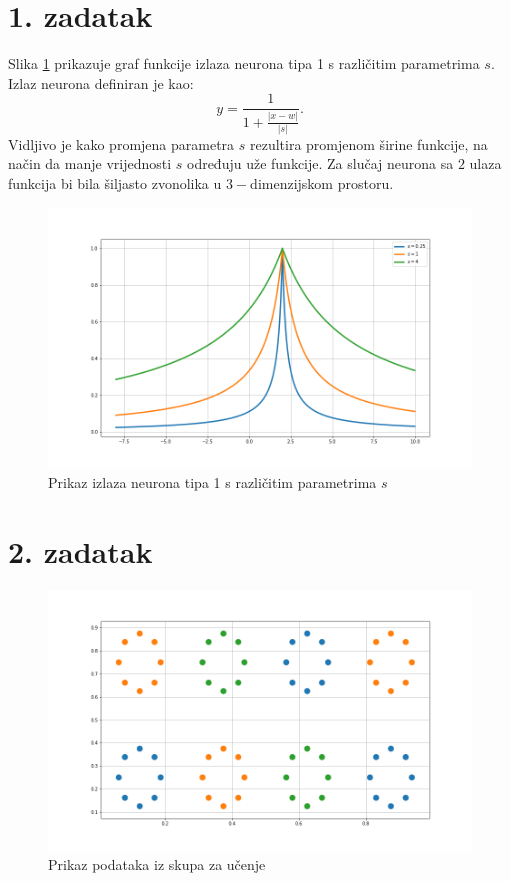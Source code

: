 \documentclass[12pt, a4paper, numeric]{article}
\begin{document}
\pagebreak

\section*{1. zadatak}
Slika \ref{fig:zad1} prikazuje graf funkcije izlaza neurona tipa 1 s različitim parametrima $s$. 
Izlaz neurona definiran je kao:
\[
    y = \frac{1}{1 + \frac{|x - w|}{|s|}}.
\]
Vidljivo je kako promjena parametra $s$ rezultira promjenom širine funkcije, na način da manje vrijednosti $s$ određuju uže funkcije.
Za slučaj neurona sa $2$ ulaza funkcija bi bila šiljasto zvonolika u $3-$dimenzijskom prostoru.

\begin{figure}[ht!] 
    \centering
    \includegraphics[width=1\textwidth]{img/zadatak1}
    \captionsetup{justification=centering}
    \caption{Prikaz izlaza neurona tipa 1 s različitim parametrima $s$}
    \label{fig:zad1}
\end{figure}
\pagebreak

\section*{2. zadatak}

\begin{figure}[ht!] 
    \centering
    \includegraphics[width=1\textwidth]{img/zadatak2}
    \captionsetup{justification=centering}
    \caption{Prikaz podataka iz skupa za učenje}
    \label{fig:zad2}
\end{figure}
\pagebreak
\end{document}
